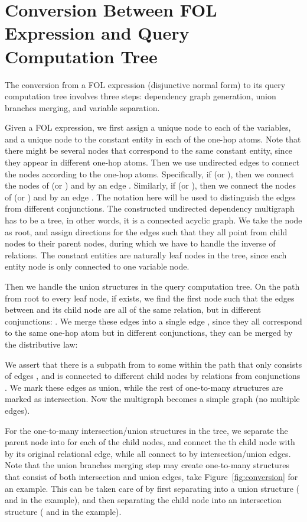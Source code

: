 \appendix
\onecolumn

\section{Conversion Between FOL Expression and Query Computation Tree}
\label{app:conversion}
The conversion from a FOL expression (disjunctive normal form) to its query computation tree involves three steps: dependency graph generation, union branches merging, and variable separation.

Given a FOL expression, we first assign a unique node to each of the variables, and a unique node to the constant entity in each of the one-hop atoms. Note that there might be several nodes that correspond to the same constant entity, since they appear in different one-hop atoms.
Then we use undirected edges to connect the nodes according to the one-hop atoms.
Specifically, if  (or ), then we connect the nodes of  (or ) and  by an edge .
Similarly, if  (or ), then we connect the nodes of  (or ) and  by an edge .
The notation  here will be used to distinguish the edges from different conjunctions.
The constructed undirected dependency multigraph has to be a tree, in other words, it is a connected acyclic graph.
We take the node  as root, and assign directions for the edges such that they all point from child nodes to their parent nodes, during which we have to handle the inverse of relations.
The constant entities are naturally leaf nodes in the tree, since each entity node is only connected to one variable node.

Then we handle the union structures in the query computation tree.
On the path  from root to every leaf node, if exists, we find the first node  such that the edges between  and its child node  are all of the same relation, but in different conjunctions: .
We merge these edges into a single edge , since they all correspond to the same one-hop atom but in different conjunctions, they can be merged by the distributive law:

We assert that there is a subpath from  to some  within the path  that only consists of edges , and  is connected to different child nodes by relations from conjunctions .
We mark these edges as union, while the rest of one-to-many structures are marked as intersection.
Now the multigraph becomes a simple graph (no multiple edges).

For the one-to-many intersection/union structures in the tree, we separate the parent node  into  for each of the child nodes, and connect the th child node with  by its original relational edge, while all  connect to  by intersection/union edges.
Note that the union branches merging step may create one-to-many structures that consist of both intersection and union edges, take Figure~\ref{fig:conversion} for an example.
This can be taken care of by first separating  into a union structure ( and  in the example), and then separating the child node into an intersection structure ( and  in the example).

